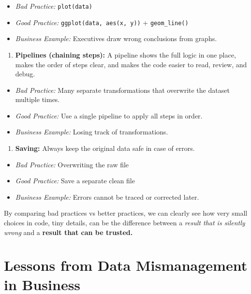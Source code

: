 \documentclass[
  stu,
  floatsintext,
  longtable,
  a4paper,
  nolmodern,
  notxfonts,
  notimes,
  colorlinks=true,linkcolor=blue,citecolor=blue,urlcolor=blue]{apa7}
\providecommand{\tightlist}{%
  \setlength{\itemsep}{0pt}\setlength{\parskip}{0pt}}
\begin{document}
\begin{itemize}
\tightlist
\item
  \emph{Bad Practice:} \texttt{plot(data)}
\item
  \emph{Good Practice:} \texttt{ggplot(data,\ aes(x,\ y))} +
  \texttt{geom\_line()}
\item
  \emph{Business Example:} Executives draw wrong conclusions from
  graphs.
\end{itemize}

\begin{enumerate}
\def\labelenumi{\arabic{enumi}.}
\setcounter{enumi}{12}
\tightlist
\item
  \textbf{Pipelines (chaining steps):} A pipeline shows the full logic
  in one place, makes the order of steps clear, and makes the code
  easier to read, review, and debug.
\end{enumerate}

\begin{itemize}
\tightlist
\item
  \emph{Bad Practice:} Many separate transformations that overwrite the
  dataset multiple times.
\item
  \emph{Good Practice:} Use a single pipeline to apply all steps in
  order.
\item
  \emph{Business Example:} Losing track of transformations.
\end{itemize}

\begin{enumerate}
\def\labelenumi{\arabic{enumi}.}
\setcounter{enumi}{13}
\tightlist
\item
  \textbf{Saving:} Always keep the original data safe in case of errors.
\end{enumerate}

\begin{itemize}
\tightlist
\item
  \emph{Bad Practice:} Overwriting the raw file
\item
  \emph{Good Practice:} Save a separate clean file
\item
  \emph{Business Example:} Errors cannot be traced or corrected later.
\end{itemize}

By comparing bad practices vs better practices, we can clearly see how
very small choices in code, tiny details, can be the difference between
a \emph{result that is silently wrong} and a \textbf{result that can be
trusted.}

\section{Lessons from Data Mismanagement in
Business}\label{lessons-from-data-mismanagement-in-business}
\end{document}

